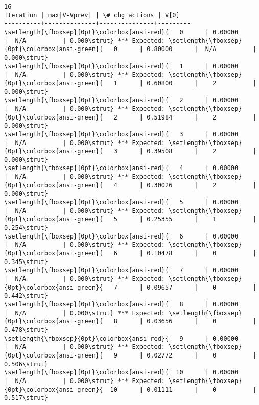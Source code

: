 \documentclass[11pt]{article}
\begin{document}
    \begin{Verbatim}[commandchars=\\\{\}]
16
Iteration | max|V-Vprev| | \# chg actions | V[0]
----------+--------------+---------------+---------
\setlength{\fboxsep}{0pt}\colorbox{ansi-red}{   0      | 0.00000      |  N/A          | 0.000\strut} *** Expected: \setlength{\fboxsep}{0pt}\colorbox{ansi-green}{   0      | 0.80000      |  N/A          | 0.000\strut}
\setlength{\fboxsep}{0pt}\colorbox{ansi-red}{   1      | 0.00000      |  N/A          | 0.000\strut} *** Expected: \setlength{\fboxsep}{0pt}\colorbox{ansi-green}{   1      | 0.60800      |    2          | 0.000\strut}
\setlength{\fboxsep}{0pt}\colorbox{ansi-red}{   2      | 0.00000      |  N/A          | 0.000\strut} *** Expected: \setlength{\fboxsep}{0pt}\colorbox{ansi-green}{   2      | 0.51984      |    2          | 0.000\strut}
\setlength{\fboxsep}{0pt}\colorbox{ansi-red}{   3      | 0.00000      |  N/A          | 0.000\strut} *** Expected: \setlength{\fboxsep}{0pt}\colorbox{ansi-green}{   3      | 0.39508      |    2          | 0.000\strut}
\setlength{\fboxsep}{0pt}\colorbox{ansi-red}{   4      | 0.00000      |  N/A          | 0.000\strut} *** Expected: \setlength{\fboxsep}{0pt}\colorbox{ansi-green}{   4      | 0.30026      |    2          | 0.000\strut}
\setlength{\fboxsep}{0pt}\colorbox{ansi-red}{   5      | 0.00000      |  N/A          | 0.000\strut} *** Expected: \setlength{\fboxsep}{0pt}\colorbox{ansi-green}{   5      | 0.25355      |    1          | 0.254\strut}
\setlength{\fboxsep}{0pt}\colorbox{ansi-red}{   6      | 0.00000      |  N/A          | 0.000\strut} *** Expected: \setlength{\fboxsep}{0pt}\colorbox{ansi-green}{   6      | 0.10478      |    0          | 0.345\strut}
\setlength{\fboxsep}{0pt}\colorbox{ansi-red}{   7      | 0.00000      |  N/A          | 0.000\strut} *** Expected: \setlength{\fboxsep}{0pt}\colorbox{ansi-green}{   7      | 0.09657      |    0          | 0.442\strut}
\setlength{\fboxsep}{0pt}\colorbox{ansi-red}{   8      | 0.00000      |  N/A          | 0.000\strut} *** Expected: \setlength{\fboxsep}{0pt}\colorbox{ansi-green}{   8      | 0.03656      |    0          | 0.478\strut}
\setlength{\fboxsep}{0pt}\colorbox{ansi-red}{   9      | 0.00000      |  N/A          | 0.000\strut} *** Expected: \setlength{\fboxsep}{0pt}\colorbox{ansi-green}{   9      | 0.02772      |    0          | 0.506\strut}
\setlength{\fboxsep}{0pt}\colorbox{ansi-red}{  10      | 0.00000      |  N/A          | 0.000\strut} *** Expected: \setlength{\fboxsep}{0pt}\colorbox{ansi-green}{  10      | 0.01111      |    0          | 0.517\strut}

\end{Verbatim}
\end{document}
